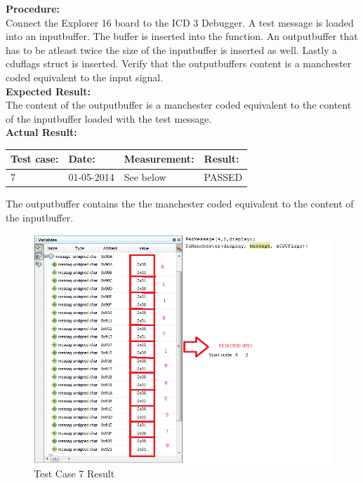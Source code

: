 \textbf{Procedure:}\\
Connect the Explorer 16 board to the ICD 3 Debugger. A test message is loaded into an inputbuffer. The buffer is inserted into the function. An outputbuffer that has to be atleast twice the size of the inputbuffer is inserted as well. Lastly a cduflags struct is inserted. Verify that the outputbuffers content is a manchester coded equivalent to the input signal.\\

\textbf{Expected Result:}\\
The content of the outputbuffer is a manchester coded equivalent to the content of the inputbuffer loaded with the test message.\\

\textbf{Actual Result:}\\
\begin{table}[H]
\centering
\begin{tabular}{|p{2cm}|p{2cm}|p{3cm}|p{2cm}|}\hline
\textbf{Test case:} & \textbf{Date:} & \textbf{Measurement:} & \textbf{Result:} \\ \hline
7 & 01-05-2014 & See below & PASSED \\ \hline
\end{tabular}
\end{table}
The outputbuffer contains the the manchester coded equivalent to the content of the inputbuffer.\\

\begin{figure}[H]
\centering
\includegraphics[width=1\textwidth]{billeder/CDUtestcase7}
\caption{Test Case 7 Result}
\label{fig:cdutestcase7}
\end{figure}


